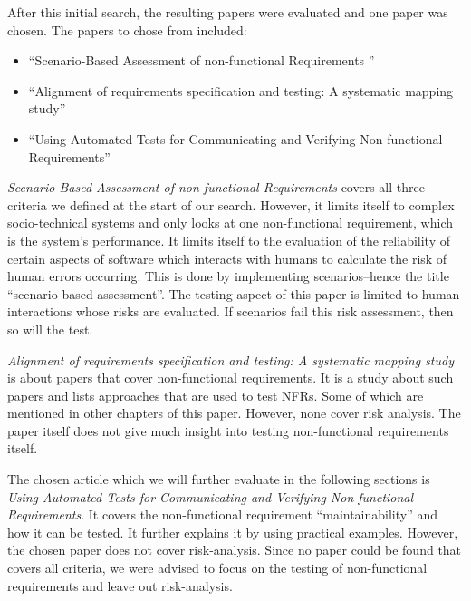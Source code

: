 After this initial search, the resulting papers were evaluated and one paper was chosen. The papers to chose from included:

\begin{itemize}
	\item \enquote{Scenario-Based Assessment of non-functional Requirements } \cite{Andre_Search_1}
	\item \enquote{Alignment of requirements specification and testing: A systematic mapping study} \cite{Andre_Search_2}
	\item \enquote{Using Automated Tests for Communicating and Verifying Non-functional Requirements} \cite{Lagerstedt2014}
\end{itemize}


\textit{Scenario-Based Assessment of non-functional Requirements} covers all three criteria we defined at the start of our search. However, it limits itself to complex socio-technical systems and only looks at one non-functional requirement, which is the system's performance.  It limits itself to the evaluation of the reliability of certain aspects of software which interacts with humans to calculate the risk of human errors occurring.
This is done by implementing scenarios--hence the title \enquote{scenario-based assessment}. The testing aspect of this paper is limited to human-interactions whose risks are evaluated. If scenarios fail this risk assessment, then so will the test.

\textit{Alignment of requirements specification and testing: A systematic mapping study} is about papers that cover non-functional requirements. It is a study about such papers and lists approaches that are used to test NFRs. Some of which are mentioned in other chapters of this paper. However, none cover risk analysis. The paper itself does not give much insight into testing non-functional requirements itself.

The chosen article which we will further evaluate in the following sections is \textit{Using Automated Tests for Communicating and Verifying Non-functional Requirements}. It covers the non-functional requirement \enquote{maintainability} and how it can be tested. It further explains it by using practical examples.
However, the chosen paper does not cover risk-analysis. Since no paper could be found that covers all criteria, we were advised to focus on the testing of non-functional requirements and leave out risk-analysis.




